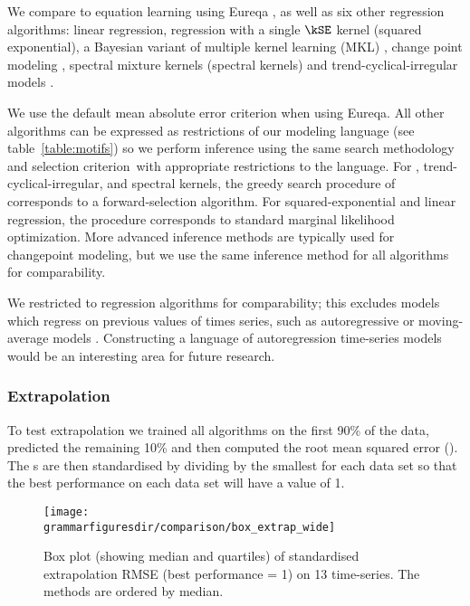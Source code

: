 We compare \procedurename{} to equation learning using Eureqa \citep{Eureqa}, as well as six other regression algorithms: linear regression, \gp{} regression with a single $\kSE$ kernel (squared exponential), a Bayesian variant of multiple kernel learning (MKL) \citep[e.g.][]{bach2004multiple}, change point modeling \citep[e.g.][]{garnett2010sequential, saatcci2010gaussian, FoxDunson:NIPS2012}, spectral mixture kernels \citep{WilAda13} (spectral kernels) and trend-cyclical-irregular models \citep[e.g.][]{lind2006basic}.

We use the default mean absolute error criterion when using Eureqa.
All other algorithms can be expressed as restrictions of our modeling language (see table~\ref{table:motifs}) so we perform inference using the same search methodology and selection criterion\footnotemark~with appropriate restrictions to the language.
For \MKL{}, trend-cyclical-irregular, and spectral kernels, the greedy search procedure of \procedurename{} corresponds to a forward-selection algorithm.
For squared-exponential and linear regression, the procedure corresponds to standard marginal likelihood optimization.
More advanced inference methods are typically used for changepoint modeling, but we use the same inference method for all algorithms for comparability.

We restricted to regression algorithms for comparability; this excludes models which regress on previous values of times series, such as autoregressive or moving-average models \citep[e.g.][]{box2013time}.
Constructing a language of autoregression time-series models would be an interesting area for future research.



\subsubsection{Extrapolation}

To test extrapolation we trained all algorithms on the first 90\% of the data, predicted the remaining 10\% and then computed the root mean squared error (\RMSE{}).
The \RMSE{}s are then standardised by dividing by the smallest \RMSE{} for each data set so that the best performance on each data set will have a value of 1.

\begin{figure}[h!]
\texttt{[image: \\grammarfiguresdir/comparison/box\_extrap\_wide]}
\caption[Comparision of extrapolation error of all methods on 13 time-series datasets.]
{Box plot (showing median and quartiles) of standardised extrapolation RMSE (best performance = 1) on 13 time-series.
The methods are ordered by median.
}
\label{fig:box_extrap_dist}
\end{figure}


